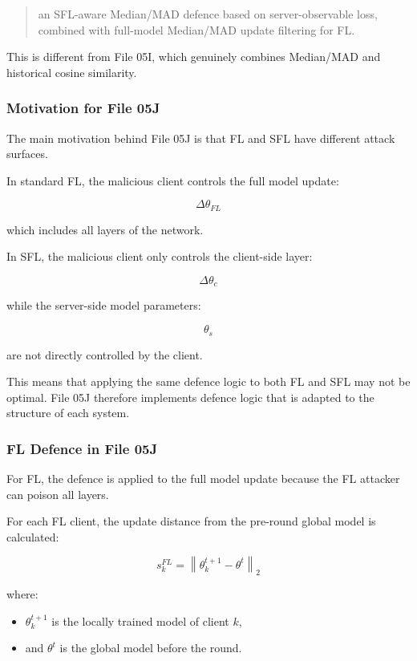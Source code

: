 \begin{quote}
an SFL-aware Median/MAD defence based on server-observable loss, combined with full-model Median/MAD update filtering for FL.
\end{quote}

This is different from File 05I, which genuinely combines Median/MAD and historical cosine similarity.

\subsubsection*{Motivation for File 05J}

The main motivation behind File 05J is that FL and SFL have different attack surfaces.

In standard FL, the malicious client controls the full model update:

\[
\Delta \theta_{FL}
\]

which includes all layers of the network.

In SFL, the malicious client only controls the client-side layer:

\[
\Delta \theta_c
\]

while the server-side model parameters:

\[
\theta_s
\]

are not directly controlled by the client.

This means that applying the same defence logic to both FL and SFL may not be optimal. File 05J therefore implements defence logic that is adapted to the structure of each system.

\subsubsection*{FL Defence in File 05J}

For FL, the defence is applied to the full model update because the FL attacker can poison all layers.

For each FL client, the update distance from the pre-round global model is calculated:

\[
s_k^{FL}
=
\left\|
\theta_k^{t+1}
-
\theta^{t}
\right\|_2
\]

where:
\begin{itemize}
    \item $\theta_k^{t+1}$ is the locally trained model of client $k$,
    \item and $\theta^{t}$ is the global model before the round.
\end{itemize}

